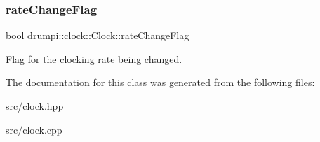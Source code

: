 \subsubsection{\texorpdfstring{rate\+Change\+Flag}{rateChangeFlag}}
{\footnotesize\ttfamily bool drumpi\+::clock\+::\+Clock\+::rate\+Change\+Flag\hspace{0.3cm}{\ttfamily [protected]}}

Flag for the clocking rate being changed. 

The documentation for this class was generated from the following files\+:\begin{DoxyCompactItemize}
\item 
src/clock.\+hpp\item 
src/clock.\+cpp\end{DoxyCompactItemize}
